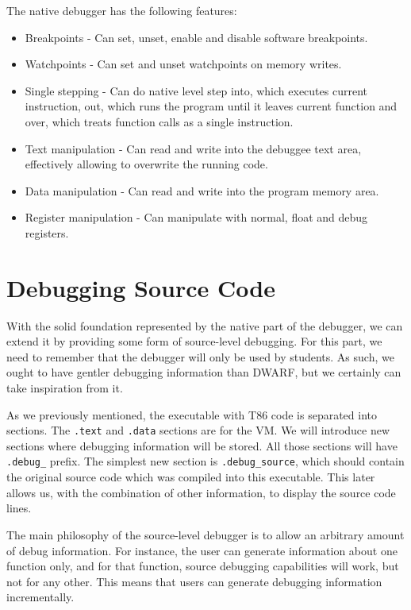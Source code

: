 The native debugger has the following features:
\begin{itemize}
    \item Breakpoints - Can set, unset, enable and disable software breakpoints.
    \item Watchpoints - Can set and unset watchpoints on memory writes.
    \item Single stepping - Can do native level step into, which executes
        current instruction, out, which runs the program until it leaves
        current function and over, which treats function calls as a single
        instruction.
    \item Text manipulation - Can read and write into the debuggee text area,
        effectively allowing to overwrite the running code.
    \item Data manipulation - Can read and write into the program memory area.
    \item Register manipulation - Can manipulate with normal, float and debug registers.
\end{itemize}

\section{Debugging Source Code}\label{section:source-debugger}
With the solid foundation represented by the native part of the debugger, we
can extend it by providing some form of source-level debugging. For this part,
we need to remember that the debugger will only be used by students. As such,
we ought to have gentler debugging information than DWARF, but we certainly can
take inspiration from it.

As we previously mentioned, the executable with T86 code is separated into
sections. The \texttt{.text} and \texttt{.data} sections are for the VM. We
will introduce new sections where debugging information will be stored. All
those sections will have \verb|.debug_| prefix. The simplest new section is
\verb|.debug_source|, which should contain the original source code which was
compiled into this executable. This later allows us, with the combination of
other information, to display the source code lines.

The main philosophy of the source-level debugger is to allow an arbitrary
amount of debug information. For instance, the user can generate information
about one function only, and for that function, source debugging capabilities
will work, but not for any other. This means that users can generate debugging
information incrementally.


